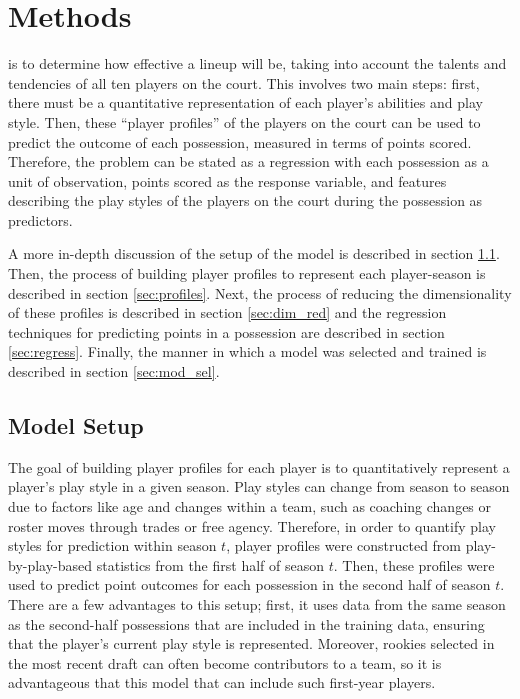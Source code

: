 
\chapter{Methods}
\label{ch:methods}

 is to determine how
effective a lineup will be, taking into account the talents and tendencies of all
ten players on the court. This involves two main steps: first, there must be a
quantitative representation of each player's abilities and play style. Then, these
``player profiles'' of the players on the court can be used to predict the outcome
of each possession, measured in terms of points scored. Therefore, the problem can
be stated as a regression with each possession as a unit of observation, points
scored as the response variable, and features describing the play styles of the
players on the court during the possession as predictors.

A more in-depth discussion of the setup of the model is described in section
\ref{sec:setup}. Then, the process of building player profiles to represent each
player-season is described in section \ref{sec:profiles}. Next, the process of
reducing the dimensionality of these profiles is described in section
\ref{sec:dim_red} and the regression techniques for predicting points in a
possession are described in section \ref{sec:regress}. Finally, the manner in which
a model was selected and trained is described in section \ref{sec:mod_sel}.

\section{Model Setup}
\label{sec:setup}

The goal of building player profiles for each player is to quantitatively represent
a player's play style in a given season. Play styles can change from season to
season due to factors like age and changes within a team, such as coaching changes
or roster moves through trades or free agency. Therefore, in order to quantify play
styles for prediction within season $t$, player profiles were constructed from
play-by-play-based statistics from the first half of season $t$.  Then, these
profiles were used to predict point outcomes for each possession in the second half
of season $t$. There are a few advantages to this setup; first, it uses data from
the same season as the second-half possessions that are included in the training
data, ensuring that the player's current play style is represented.  Moreover,
rookies selected in the most recent draft can often become contributors to a team,
so it is advantageous that this model that can include such first-year players.

